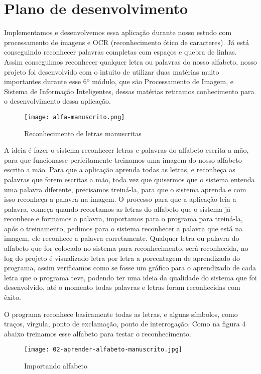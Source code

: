 \newpage
\section{Plano de desenvolvimento}

	Implementamos e desenvolvemos essa aplicação durante nosso estudo com processamento de imagens e OCR (reconhecimento ótico de caracteres). Já está conseguindo reconhecer palavras completas com espaços e quebra de linhas. Assim conseguimos reconhecer qualquer letra ou palavras do nosso alfabeto, nosso projeto foi desenvolvido com o intuito de utilizar duas matérias muito importantes durante esse 6º módulo, que são Processamento de Imagem, e Sistema de Informação Inteligentes, dessas matérias retiramos conhecimento para o desenvolvimento dessa aplicação. 
	
	\begin{figure}[!htb]
		\texttt{[image: alfa-manuscrito.png]}
		\caption{Reconhecimento de letras manuscritas}
	\end{figure}
	
	A ideia é fazer o sistema reconhecer letras e palavras do alfabeto escrita a mão, para que funcionasse perfeitamente treinamos uma imagem do nosso alfabeto escrito a mão. Para que a aplicação aprenda todas as letras, e reconheça as palavras que forem escritas a mão, toda vez que quisermos que o sistema entenda uma palavra diferente, precisamos treiná-la, para que o sistema aprenda e com isso reconheça a palavra na imagem. O processo para que a aplicação leia a palavra, começa quando recortamos as letras do alfabeto que o sistema já reconhece e formamos a palavra, importamos para o programa para treiná-la, após o treinamento, pedimos para o sistema reconhecer a palavra que está na imagem, ele reconhece a palavra corretamente. Qualquer letra ou palavra do alfabeto que for colocado no sistema para reconhecimento, será reconhecida, no log do projeto é visualizado letra por letra a porcentagem de aprendizado do programa, assim verificamos como se fosse um gráfico para o aprendizado de cada letra que o programa teve, podendo ter uma ideia da qualidade do sistema que foi desenvolvido, até o momento todas palavras e letras foram reconhecidas com êxito.

	O programa reconhece basicamente todas as letras, e alguns símbolos, como traços, vírgula, ponto de exclamação, ponto de interrogação. Como na figura 4 abaixo treinamos esse alfabeto para testar o reconhecimento.
	
	\begin{figure}[!htb]
		\centering
		\texttt{[image: 02-aprender-alfabeto-manuscrito.jpg]} 
		\caption{Importando alfabeto} 
	\end{figure} 
	
